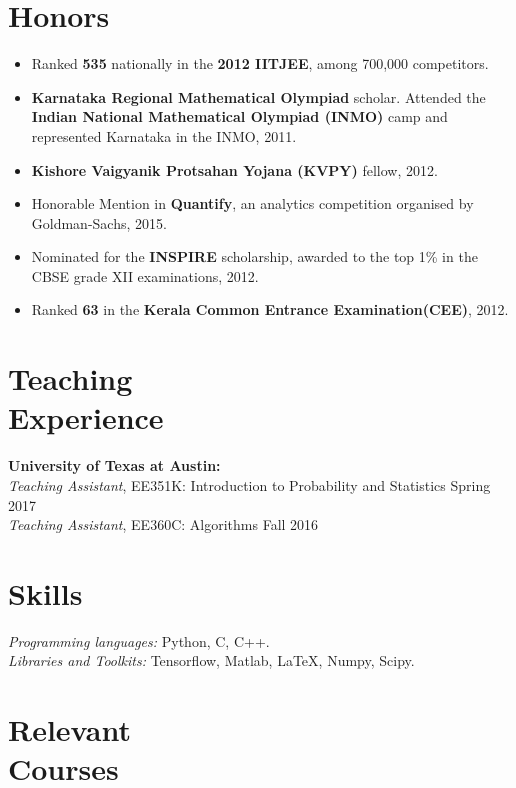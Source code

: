 \documentclass[margin, 11pt]{res} %
\begin{document}
\begin{resume}

\section{\large Honors}
\begin{itemize}\itemsep -2pt
	\item Ranked {\bf 535} nationally in the {\bf 2012 IITJEE}, among 700,000 competitors.
	\item {\bf Karnataka Regional Mathematical Olympiad} scholar. Attended the {\bf Indian National Mathematical Olympiad (INMO)} camp and represented Karnataka
	in the INMO, 2011.
	\item {\bf Kishore Vaigyanik Protsahan Yojana (KVPY)} fellow, 2012.
	\item Honorable Mention in {\bf Quantify}, an analytics competition organised by Goldman-Sachs,
	2015.
	\item Nominated for the {\bf INSPIRE} scholarship, awarded to the top 1\% in the CBSE grade XII
	examinations, 2012.
	\item Ranked {\bf 63} in the {\bf Kerala Common Entrance Examination(CEE)}, 2012.
\end{itemize}

\section{\large Teaching \\ Experience}
{\bf University of Texas at Austin:}\\
{\sl Teaching Assistant}, EE351K: Introduction to Probability and Statistics \hfill Spring 2017\\
{\sl Teaching Assistant}, EE360C: Algorithms \hfill Fall 2016

\section{\large Skills}
{\sl Programming languages:} Python, C, C++.\\
{\sl Libraries and Toolkits:} Tensorflow, Matlab, \LaTeX, Numpy, Scipy.

\section{\large Relevant \\ Courses}


\end{resume}
\end{document}
